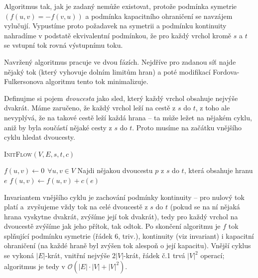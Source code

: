 \documentclass[12pt]{article}
\newcommand{\la}{\leftarrow}
\renewcommand{\O}{\mathcal{O}}
\begin{document}
\noindent
Algoritmus tak, jak je zadaný nemůže existovat, protože podmínka symetrie
$(f(u,v) = -f(v,u))$ a podmínka kapacitního ohraničení se navzájem vylučují.
Vypustíme proto po\-ža\-da\-vek na symetrii a podmínku kontinuity nahradíme v
podstatě ekvivalentní podmínkou, že pro každý vrchol kromě $s$ a $t$ se vstupní
tok rovná výstupnímu toku.

Navržený algoritmus pracuje ve dvou fázích. Nejdříve pro zadanou síť najde nějaký tok (který
vyhovuje dolním limitům hran) a poté modifikací Fordova-Fulkersonova algoritmu tento tok
minimalizuje.

Definujme si pojem \emph{dvoucesta} jako sled, který každý vrchol obsahuje nejvýše dvakrát. Máme
zaručeno, že každý vrchol leží na cestě z $s$ do $t$, z toho ale nevyplývá, že na takové cestě leží
každá hrana -- ta může ležet na nějakém cyklu, aniž by byla součástí nějaké cesty z $s$ do $t$.
Proto musíme na začátku vnějšího cyklu hledat dvoucesty.

\begin{algorithm}
\textsc{InitFlow}$(V,E,s,t,c)$
\begin{algorithmic}[1]
\STATE $f(u,v) \la 0 \ \ \forall u,v \in V$
\STATE Najdi nějakou dvoucestu $p$ z $s$ do $t$, která obsahuje hranu $e$
\STATE $f(u,v) \la f(u,v) + c(e)$
\ENDFOR
\ENDFOR
\end{algorithmic}
\end{algorithm}

\noindent
Invariantem vnějšího cyklu je zachování podmínky kontinuity -- pro nulový tok platí a~zvy\-šu\-je\-me vždy
tok na celé dvoucestě z $s$ do $t$ (pokud se na ní nějaká hrana vyskytne dvakrát, zvýšíme její tok
dvakrát), tedy pro každý vrchol na dvoucestě zvýšíme jak jeho přítok, tak odtok. Po skončení
algoritmu je $f$ tok splňující podmínku symetrie (řádek 6, triv.), kontinuity (viz invariant) i
kapacitní ohraničení (na každé hraně byl zvýšen tok alespoň o její kapacitu). Vnější cyklus se vykoná
$|E|$-krát, vnitřní nejvýše $2|V|$-krát, řádek č.1 trvá $|V|^2$ operací; algoritmus je tedy v
$\O(|E|\cdot|V| + |V|^2)$.
\end{document}
